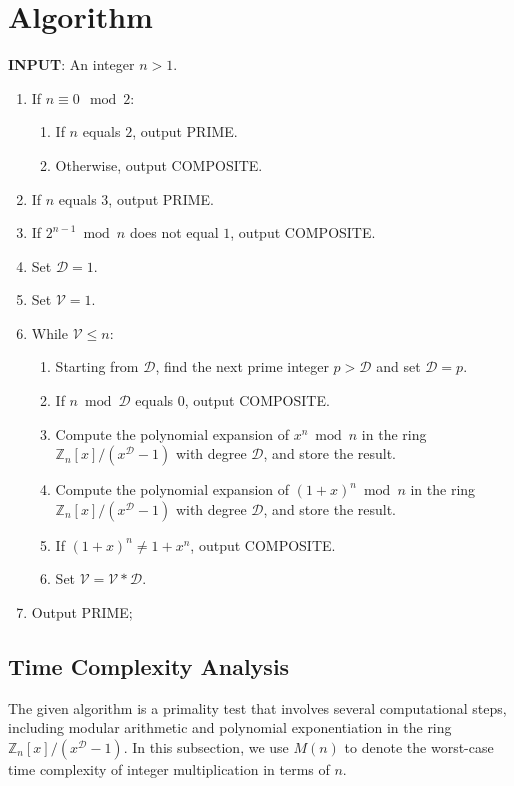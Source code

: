 \documentclass{article}
\theoremstyle{plain}
\theoremstyle{definition}
\newcommand{\Z}{\mathbb{Z}}
\newcommand{\Mx}{\Z_n[x]/(x^\D - 1)}
\newcommand{\D}{\mathcal{D}}
\newcommand{\Vcal}{\mathcal{V}}
\begin{document}
\section{Algorithm} \label{section:algorithm}
\textbf{INPUT}: An integer $n > 1$.
\begin{center}
    \begin{enumerate}[label*=\arabic*.]
        \item If $n \equiv 0 \mod{2}$:
            \begin{enumerate}[label*=\arabic*.]
                \item If $n$ equals $2$, output PRIME.
                \item Otherwise, output COMPOSITE.
            \end{enumerate}
        \item If $n$ equals $3$, output PRIME.
        \item If $2^{n-1} \bmod{n}$ does not equal $1$, output COMPOSITE.
        \item Set $\D=1$.
        \item Set $\Vcal=1$.
        \item While $\Vcal \leq n$:
        \begin{enumerate}[label*=\arabic*.]
            \item Starting from $\D$, find the next prime integer $p > \D$ and set $\D=p$.
            \item If $n \bmod{\D}$ equals $0$, output COMPOSITE.
            \item Compute the polynomial expansion of $x^n \bmod{n}$ in the ring $\Z_n[x]/(x^\D-1)$ with degree $\D$, and store the result.
            \item Compute the polynomial expansion of $(1 + x)^n \bmod{n}$ in the ring $\Z_n[x]/(x^\D-1)$ with degree $\D$, and store the result.
            \item If $(1 + x)^n \not= 1 + x^n$, output COMPOSITE.
            \item Set $\Vcal = \Vcal \ast \D$.
        \end{enumerate}
        \item Output PRIME;
    \end{enumerate}
\end{center}

\subsection{Time Complexity Analysis} \label{subsection:timecomplexity}
The given algorithm is a primality test that involves several computational steps, including modular arithmetic and polynomial exponentiation in the ring $\Mx$. In this subsection, we use $M(n)$ to denote the worst-case time complexity of integer multiplication in terms of $n$.
\end{document}
